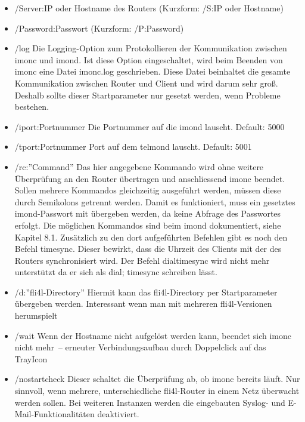   \begin{itemize}
    \item /Server:IP oder Hostname des Routers (Kurzform: /S:IP oder Hostname)
    \item /Password:Passwort (Kurzform: /P:Password)
    \item /log Die Logging-Option zum Protokollieren der Kommunikation zwischen 
      imonc und imond. Ist diese Option eingeschaltet, wird beim Beenden von 
      imonc eine Datei imonc.log geschrieben. Diese Datei beinhaltet die gesamte 
      Kommunikation zwischen Router und Client und wird darum sehr groß. Deshalb 
      sollte dieser Startparameter nur gesetzt werden, wenn Probleme bestehen.
    \item /iport:Portnummer Die Portnummer auf die imond lauscht. Default: 5000
    \item /tport:Portnummer Port auf dem telmond lauscht. Default: 5001
    \item /rc:''Command'' Das hier angegebene Kommando wird ohne weitere 
      Überprüfung an den Router übertragen und anschliessend imonc beendet. 
      Sollen mehrere Kommandos gleichzeitig ausgeführt werden, müssen diese 
      durch Semikolons getrennt werden. Damit es funktioniert, muss ein 
      gesetztes imond-Passwort mit übergeben werden, da keine Abfrage des
      Passwortes erfolgt. Die möglichen Kommandos sind beim imond dokumentiert,
      siehe Kapitel 8.1. Zusätzlich zu den dort aufgeführten Befehlen gibt es
      noch den Befehl timesync. Dieser bewirkt, dass die Uhrzeit des Clients
      mit der des Routers synchronisiert wird. Der Befehl dialtimesync wird
      nicht mehr unterstützt da er sich als \glqq{}dial; timesync\grqq{} schreiben lässt.
    \item /d:''fli4l-Directory'' Hiermit kann das fli4l-Directory per 
      Startparameter übergeben werden. Interessant wenn man mit mehreren
      fli4l-Versionen herumspielt
    \item /wait Wenn der Hostname nicht aufgelöst werden kann, beendet sich 
      imonc nicht mehr~-- erneuter Verbindungsaufbau durch Doppelclick auf das 
      TrayIcon
    \item /nostartcheck Dieser schaltet die Überprüfung ab, ob imonc bereits 
      läuft. Nur sinnvoll, wenn mehrere, unterschiedliche fli4l-Router in einem 
      Netz überwacht werden sollen. Bei weiteren Instanzen werden die 
      eingebauten Syslog- und \mbox{E-Mail}-Funktionalitäten deaktiviert.
  \end{itemize}

